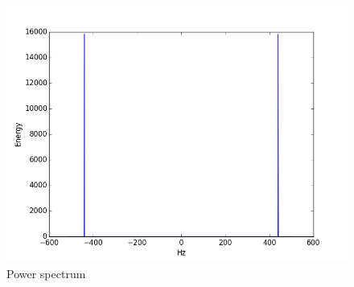 \begin{figure}[H]
\includegraphics[width=\textwidth]{2a_power_spectrum}
\caption{Power spectrum}
\label{fig:2a}
\end{figure}

